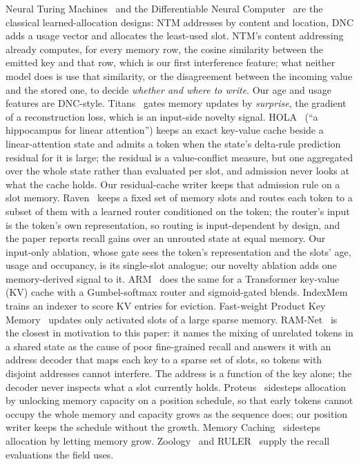 \documentclass[conference]{IEEEtran}
\begin{document}
Neural Turing Machines~\cite{graves2014ntm} and the Differentiable Neural
Computer~\cite{graves2016dnc} are the classical learned-allocation designs: NTM
addresses by content and location, DNC adds a usage vector and allocates the
least-used slot. NTM's content addressing already computes, for every memory
row, the cosine similarity between the emitted key and that row, which is our
first interference feature; what neither model does is use that similarity,
or the disagreement between the incoming value and the stored one, to decide
\emph{whether and where to write}. Our age and usage features are DNC-style.
Titans~\cite{behrouz2024titans} gates memory
updates by \emph{surprise}, the gradient of a reconstruction loss, which is an
input-side novelty signal. HOLA~\cite{cui2026hola} (``a hippocampus for
linear attention'') keeps an exact key-value cache beside a linear-attention
state and admits a token when the state's delta-rule prediction residual for
it is large; the residual is a value-conflict measure, but one aggregated over
the whole state rather than evaluated per slot, and admission never looks at
what the cache holds. Our residual-cache writer keeps that admission rule on a
slot memory. Raven~\cite{afzal2026raven} keeps a fixed set of memory slots and
routes each token to a subset of them with a learned router conditioned on the
token; the router's input is the token's own representation, so routing is
input-dependent by design, and the paper reports recall gains over an unrouted
state at equal memory. Our input-only ablation, whose gate sees the token's
representation and the slots' age, usage and occupancy, is its single-slot
analogue; our novelty ablation adds one memory-derived signal to it. ARM~\cite{zeng2026arm} does the same for a Transformer key-value (KV)
cache with a
Gumbel-softmax router and sigmoid-gated blends. IndexMem~\cite{yang2026indexmem}
trains an indexer to score KV entries for eviction. Fast-weight Product Key
Memory~\cite{zhao2026fwpkm} updates only activated slots of a large sparse
memory. RAM-Net~\cite{xiao2026ramnet} is the closest in motivation to this
paper: it names the mixing of unrelated tokens in a shared state as the cause
of poor fine-grained recall and answers it with an address decoder that maps
each key to a sparse set of slots, so tokens with disjoint addresses cannot
interfere. The address is a function of the key alone; the decoder never
inspects what a slot currently holds. Proteus~\cite{bayat2026proteus} sidesteps allocation by unlocking
memory capacity on a position schedule, so that early tokens cannot occupy
the whole memory and capacity grows as the sequence does; our position writer
keeps the schedule without the growth. Memory
Caching~\cite{behrouz2026memcache} sidesteps allocation by letting memory
grow. Zoology~\cite{arora2023zoology} and
RULER~\cite{hsieh2024ruler} supply the recall evaluations the field uses.
\end{document}
